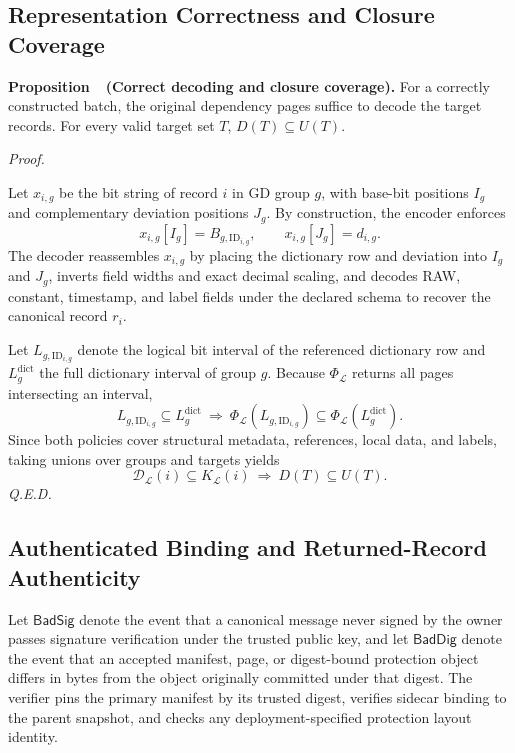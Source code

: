 \documentclass[10pt,journal]{IEEEtran}
\newcounter{proposition}
\newenvironment{proposition}[1]{%
  \refstepcounter{proposition}\par\smallskip\noindent
  \textbf{Proposition~\theproposition\ (#1). }\ignorespaces
}{\par\smallskip}
\newenvironment{claimproof}{\par\noindent\emph{Proof. }\ignorespaces
}{\hfill\textit{Q.E.D.}\par\smallskip}
\begin{document}
\subsection{Representation Correctness and Closure Coverage}\label{sec:representation-proof}\label{sec:closure-proof}
\begin{proposition}{Correct decoding and closure coverage}\label{prop:representation}\label{prop:closure}
For a correctly constructed batch, the original dependency pages suffice to decode the target records. For every valid target set $T$, $D(T)\subseteq U(T)$.
\end{proposition}
\begin{claimproof}
Let $x_{i,g}$ be the bit string of record $i$ in GD group $g$, with base-bit positions $I_g$ and complementary deviation positions $J_g$. By construction, the encoder enforces
\begin{equation}
x_{i,g}[I_g]=B_{g,\mathrm{ID}_{i,g}},\qquad
x_{i,g}[J_g]=d_{i,g}.
\end{equation}
The decoder reassembles $x_{i,g}$ by placing the dictionary row and deviation into $I_g$ and $J_g$, inverts field widths and exact decimal scaling, and decodes RAW, constant, timestamp, and label fields under the declared schema to recover the canonical record $r_i$.

Let $L_{g,\mathrm{ID}_{i,g}}$ denote the logical bit interval of the referenced dictionary row and $L_g^{\mathrm{dict}}$ the full dictionary interval of group $g$. Because $\Phi_{\mathcal L}$ returns all pages intersecting an interval,
\begin{equation}
L_{g,\mathrm{ID}_{i,g}}\subseteq L_g^{\mathrm{dict}}
\ \Longrightarrow\
\Phi_{\mathcal L}(L_{g,\mathrm{ID}_{i,g}})
\subseteq\Phi_{\mathcal L}(L_g^{\mathrm{dict}}).
\end{equation}
Since both policies cover structural metadata, references, local data, and labels, taking unions over groups and targets yields
\begin{equation}
\mathcal D_{\mathcal L}(i)\subseteq K_{\mathcal L}(i)
\ \Longrightarrow\ D(T)\subseteq U(T).
\end{equation}
\end{claimproof}

\subsection{Authenticated Binding and Returned-Record Authenticity}\label{sec:binding}\label{sec:conditional}
Let $\mathsf{BadSig}$ denote the event that a canonical message never signed by the owner passes signature verification under the trusted public key, and let $\mathsf{BadDig}$ denote the event that an accepted manifest, page, or digest-bound protection object differs in bytes from the object originally committed under that digest. The verifier pins the primary manifest by its trusted digest, verifies sidecar binding to the parent snapshot, and checks any deployment-specified protection layout identity.
\end{document}
